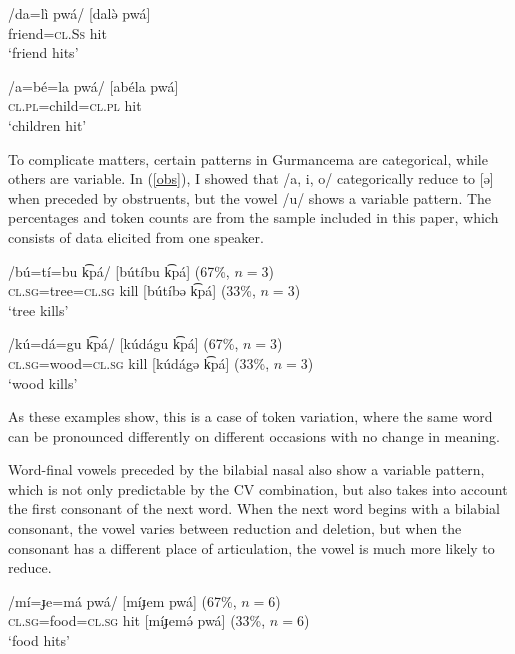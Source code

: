 \documentclass[output=paper,newtxmath,modfonts,nonflat,draftmode]{langsci/langscibook}
\begin{document}
\ea \label{ex:baird:approx}
\ea \label{ex:baird:approx:a}
\gll /da=lì pwá/ \hspace{0.8cm} [dalə̀ pwá]\\
friend=\textsc{cl.Ss} hit\\
\glt `friend hits'

\ex \label{ex:baird:approx:b}
\gll /a=bé=la pwá/ \hspace{0.5cm} [abéla pwá]\\
\textsc{cl.pl}=child=\textsc{cl.pl} hit\\
\glt `children hit'
\z
\z

To complicate matters, certain patterns in Gurmancema are categorical, while others are variable. In (\ref{obs}), I showed that /a, i, o/ categorically reduce to [ə] when preceded by obstruents, but the vowel /u/ shows a variable pattern. The percentages and token counts are from the sample included in this paper, which consists of data elicited from one speaker. 

\ea \label{u}
\ea
\gll /bú=tí=bu k͡pá/  \hspace{0.6cm} [bútíbu k͡pá] (67\%, $n=3$) \\
 \textsc{cl.sg}=tree=\textsc{cl.sg} kill \hspace{0.5cm} [bútíbə k͡pá] (33\%, $n=3$)\\ 
\glt `tree kills'

\ex
\gll /kú=dá=gu k͡pá/  \hspace{0.5cm} [kúdágu k͡pá] (67\%, $n=3$) \\
 \textsc{cl.sg}=wood=\textsc{cl.sg} kill \hspace{0.5cm} [kúdágə k͡pá] (33\%, $n=3$)\\ 
\glt `wood kills'
\z
\z

As these examples show, this is a case of token variation, where the same word can be pronounced differently on different occasions with no change in meaning. 

Word-final vowels preceded by the bilabial nasal also show a variable pattern, which is not only predictable by the CV combination, but also takes into account the first consonant of the next word. When the next word begins with a bilabial consonant, the vowel varies between reduction and deletion, but when the consonant has a different place of articulation, the vowel is much more likely to reduce. 

\ea \label{m}
\ea
\gll /mí=ɟe=má pwá/ \hspace{0.5cm} [míɟem pwá] (67\%, $n=6$)\\
 \textsc{cl.sg}=food=\textsc{cl.sg} hit  \hspace{0.5cm} [míɟemə́ pwá] (33\%, $n=6$)\\ 
\glt `food hits'
\end{document}
